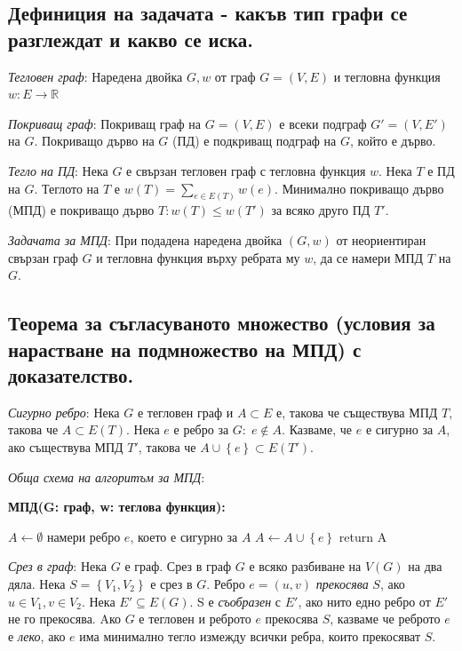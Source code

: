 \documentclass{article}
\renewcommand{\\}{\newline}
\begin{document}
\subsection{Дефиниция на задачата - какъв тип графи се разглеждат и какво се иска.}

\textit{Тегловен граф}: Наредена двойка \(G, w\)  от граф \(G = (V, E)\) и тегловна функция \(w: E \to \mathbb{R}\)   

\textit{Покриващ граф}: Покриващ граф на \(G = (V, E)\) е всеки подграф \(G' = (V, E')\) на \(G\). Покриващо дърво на \(G\) (ПД) е подкриващ подграф на \(G\), който е дърво.

\textit{Тегло на ПД}: Нека \(G\) е свързан тегловен граф с тегловна функция \(w\). Нека \(T\) е ПД на \(G\). Теглото на \(T\) е \(w(T) = \underset{e \in E(T)}{\sum}w(e)\). Минимално покриващо дърво (МПД) е покриващо дърво \(T: w(T) \leq w(T')\) за всяко друго ПД \(T'\).

\textit{Задачата за МПД}: При подадена наредена двойка \((G, w)\)  от неориентиран свързан граф \(G\) и тегловна функция върху ребрата му \(w\), да се намери МПД \(T\) на \(G\).    

\subsection{Теорема за съгласуваното множество (условия за нарастване на подмножество на МПД) с доказателство.}

\textit{Сигурно ребро}: Нека \(G\) е тегловен граф и \(A \subset E\) е, такова че съществува МПД \(T\), такова че \(A \subset E(T)\). Нека \(e\) е ребро за \(G: \; e \not\in A\). Казваме, че \(e\) е сигурно за \(A\), ако съществува МПД \(T'\), такова че \(A \cup \left\{e\right\} \subset E(T')\).

\textit{Обща схема на алгоритъм за МПД}:

\textbf{МПД(G: граф, w: теглова функция):}    
\begin{algorithmic}[1]
  \State \(A \gets \emptyset\)
    \State намери ребро \(e\), което е сигурно за \(A\) 
    \State \(A \gets A \cup \left\{e\right\}\) 
  \EndWhile
  \State return A
\end{algorithmic}

\textit{Срез в граф}: Нека \(G\) е граф. Срез в граф \(G\) е всяко разбиване на \(V(G)\) на два дяла. Нека \(S = \left\{V_1, V_2\right\}\) е срез в \(G\). Ребро \(e = (u, v)\) \textit{прекосява} \(S\), ако \(u \in V_1, v \in V_2\). Нека \(E' \subseteq E(G)\). S е \textit{съобразен} с \(E'\), ако нито едно ребро от \(E'\) не го прекосява. Aко \(G\) е тегловен и реброто \(e\) прекосява \(S\), казваме че реброто \(e\) е \textit{леко}, ако \(e\) има минимално тегло измежду всички ребра, които прекосяват \(S\).            
\end{document}
